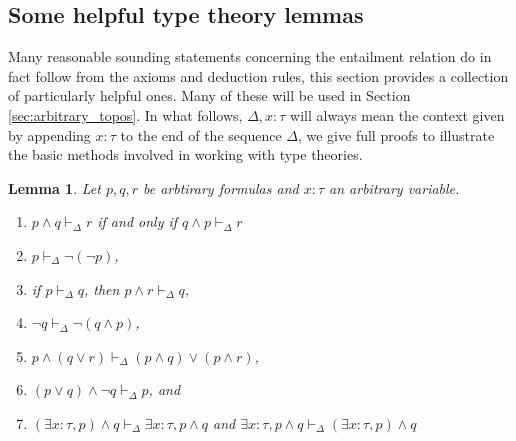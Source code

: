 \documentclass{birkjour}
\theoremstyle{plain}
\newtheorem{lemma}[thm]{Lemma}
\theoremstyle{definition}
\begin{document}
 \subsection{Some helpful type theory lemmas}\label{sec:helpful_lemmas}
	\label{helpfulLemmas}
	Many reasonable sounding statements concerning the entailment relation do in fact follow from the axioms and deduction rules, this section provides a collection of particularly helpful ones. Many of these will be used in Section \ref{sec:arbitrary_topos}. In what follows, $\Delta,x:\tau$ will always mean the context given by appending $x:\tau$ to the end of the sequence $\Delta$, we give full proofs to illustrate the basic methods involved in working with type theories.
	\begin{lemma}
		\label{weakening}
		Let $p,q,r$ be arbtirary formulas and $x:\tau$ an arbitrary variable.
		\begin{enumerate}
			\item $p \wedge q \vdash_\Delta r$ if and only if $q \wedge p \vdash_\Delta r$
			\item $p \vdash_\Delta \neg(\neg p)$,
			\item if $p \vdash_\Delta q$, then $p \wedge r \vdash_\Delta q$,
			\item $\neg q \vdash_\Delta \neg(q \wedge p)$,
			\item $p \wedge (q \vee r) \vdash_\Delta (p \wedge q) \vee (p \wedge r)$,
			\item $(p \vee q) \wedge \neg q \vdash_\Delta p$, and
			\item $(\exists x:\tau, p) \wedge q \vdash_{\Delta}\exists x:\tau, p \wedge q$ and $\exists x:\tau, p \wedge q \vdash_{\Delta} (\exists x:\tau, p) \wedge q$
		\end{enumerate}
	\end{lemma}
\end{document}
